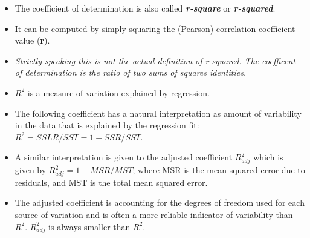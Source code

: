 \begin{itemize}
\item
The coefficient of determination is also called \textbf{\textit{r-square}} or \textbf{\textit{r-squared}}. 
\item It can be computed by simply squaring the (Pearson) correlation coefficient value (\textbf{r}).
\item \textit{Strictly speaking this is not the actual definition of r-squared. The coefficent of determination is the ratio of two sums of squares identities.}
\end{itemize}

\begin{itemize}
\item $R^2$ is a measure of variation explained by regression.

\item The following coefficient has a natural interpretation as amount
of variability in the data that is explained by the regression
fit: $R^2 = SSLR/SST = 1 - SSR/SST$.

\item A similar interpretation is given to the adjusted coefficient
$R^2_{adj}$ which is given by $R^2_{adj} = 1 - MSR/MST $; where
MSR is the mean squared error due to residuals, and MST is the
total mean squared error.

\item The adjusted coefficient is accounting for the degrees of freedom
used for each source of variation and is often a more reliable
indicator of variability than $R^2$. $R^2_{adj}$ is always smaller
than $R^2$.
\end{itemize}






